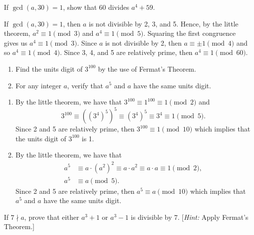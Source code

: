 \begin{exercise}
    If $\gcd(a, 30) = 1$, show that 60 divides $a^4 + 59$. \\
\end{exercise}

\begin{solution}
    If $\gcd(a, 30) = 1$, then $a$ is not divisible by 2, 3, and 5. Hence, by the little theorem, $a^2 \equiv 1 \pmod 3$ and $a^4 \equiv 1 \pmod 5$. Squaring the first congruence gives us $a^4 \equiv 1 \pmod 3$. Since $a$ is not divisible by 2, then $a \equiv \pm 1 \pmod 4$ and so $a^4 \equiv 1 \pmod 4$. Since 3, 4, and 5 are relatively prime, then $a^4 \equiv 1 \pmod{60}$. \\
\end{solution}

\begin{exercise}
    \begin{enumerate}
        \item Find the units digit of $3^{100}$ by the use of Fermat's Theorem.
        \item For any integer $a$, verify that $a^5$ and $a$ have the same units digit.
    \end{enumerate} 
\end{exercise}

\begin{solution}
    \begin{enumerate}
        \item By the little theorem, we have that $3^{100} \equiv 1^{100} \equiv 1 \pmod 2$ and
        $$3^{100} \equiv ((3^4)^5)^5 \equiv (3^4)^5 \equiv 3^4 \equiv 1 \pmod 5.$$
        Since 2 and 5 are relatively prime, then $3^{100} \equiv 1 \pmod{10}$ which implies that the units digit of $3^{100}$ is 1.
        \item By the little theorem, we have that
        \begin{align*}
            a^5 &\equiv a \cdot (a^2)^2 \equiv a\cdot a^2 \equiv a\cdot a \equiv 1 \pmod 2, \\
            a^5 &\equiv a \pmod 5.
        \end{align*}
        Since 2 and 5 are relatively prime, then $a^5 \equiv a \pmod{10}$ which implies that $a^5$ and $a$ have the same units digit. \\
    \end{enumerate}
\end{solution}

\begin{exercise}
    If $7 \nmid a$, prove that either $a^3 + 1$ or $a^3 - 1$ is divisible by 7. [\textit{Hint:} Apply Fermat's Theorem.] \\
\end{exercise}

